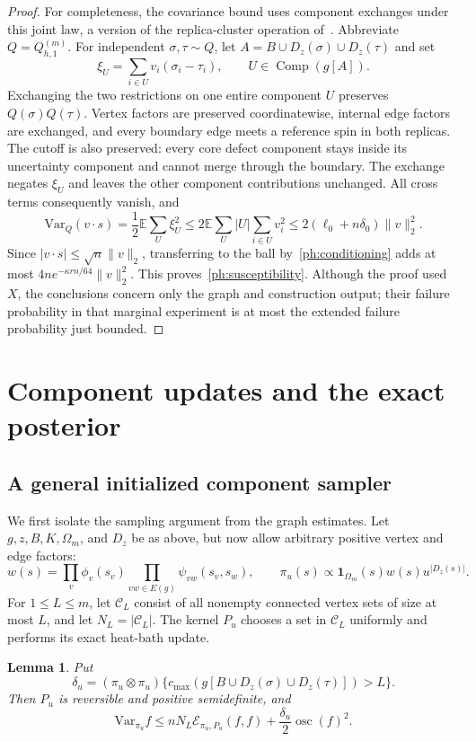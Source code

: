 \documentclass[11pt]{article}
\newcommand{\Var}{\mathrm{Var}}
\def\E{\mathbb{E}}
\newtheorem{lemma}[thm]{Lemma}
\numberwithin{equation}{section}
\begin{document}
\begin{proof}
For completeness, the covariance bound uses component exchanges under this joint law, a version of the replica-cluster operation of~\cite{Hou01}. Abbreviate $Q=Q_{h,1}^{(m)}$. For independent $\sigma,\tau\sim Q$, let $A=B\cup D_z(\sigma)\cup D_z(\tau)$ and set
\[
    \xi_U=\sum_{i\in U}v_i(\sigma_i-\tau_i),
    \qquad U\in\operatorname{Comp}(g[A]).
\]
Exchanging the two restrictions on one entire component $U$ preserves $Q(\sigma)Q(\tau)$. Vertex factors are preserved coordinatewise, internal edge factors are exchanged, and every boundary edge meets a reference spin in both replicas. The cutoff is also preserved: every core defect component stays inside its uncertainty component and cannot merge through the boundary. The exchange negates $\xi_U$ and leaves the other component contributions unchanged. All cross terms consequently vanish, and
\[
 \Var_Q(v\cdot s)=\frac12\E\sum_U\xi_U^2
 \le2\E\sum_U|U|\sum_{i\in U}v_i^2
 \le2(\ell_0+n\delta_0)\|v\|_2^2.
\]
Since $|v\cdot s|\le\sqrt n\|v\|_2$, transferring to the ball by~\eqref{ph:conditioning} adds at most $4ne^{-\kappa rn/64}\|v\|_2^2$. This proves~\eqref{ph:susceptibility}. Although the proof used $X$, the conclusions concern only the graph and construction output; their failure probability in that marginal experiment is at most the extended failure probability just bounded.
\end{proof}

\section{Component updates and the exact posterior}\label{ph:section_sampling}

\subsection{A general initialized component sampler}

We first isolate the sampling argument from the graph estimates. Let $g,z,B,K,\Omega_m$, and $D_z$ be as above, but now allow arbitrary positive vertex and edge factors:
\[
 w(s)=\prod_v\phi_v(s_v)\prod_{vw\in E(g)}\psi_{vw}(s_v,s_w),
 \qquad \pi_u(s)\propto\mathbf1_{\Omega_m}(s)w(s)u^{|D_z(s)|}.
\]
For $1\le L\le m$, let $\mathcal C_L$ consist of all nonempty connected vertex sets of size at most $L$, and let $N_L=|\mathcal C_L|$. The kernel $P_u$ chooses a set in $\mathcal C_L$ uniformly and performs its exact heat-bath update.

\begin{lemma}\label{ph:flow}
Put
\[
 \delta_u=(\pi_u\otimes\pi_u)
   \{c_{\max}(g[B\cup D_z(\sigma)\cup D_z(\tau)])>L\}.
\]
Then $P_u$ is reversible and positive semidefinite, and
\begin{equation}\label{ph:weak_pi}
    \Var_{\pi_u}f\le nN_L\mathcal E_{\pi_u,P_u}(f,f)
                      +\frac{\delta_u}{2}\operatorname{osc}(f)^2.
\end{equation}
\end{lemma}
\end{document}
